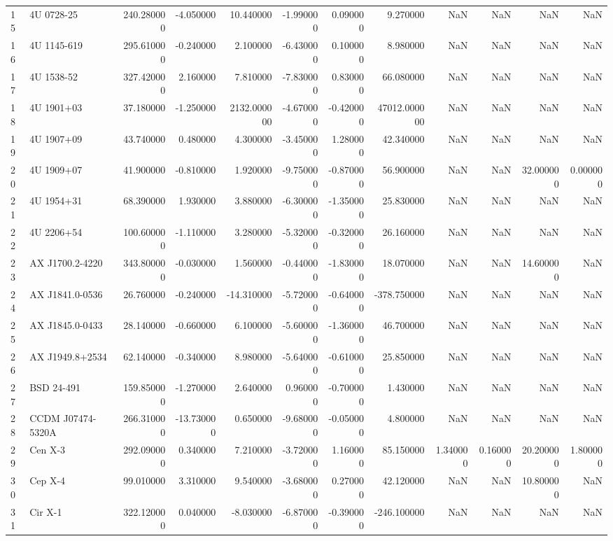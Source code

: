 \begin{tabular}{llrrrrrrrrrr}
15 & 4U 0728-25 & 240.280000 & -4.050000 & 10.440000 & -1.990000 & 0.090000 & 9.270000 & NaN & NaN & NaN & NaN \\
16 & 4U 1145-619 & 295.610000 & -0.240000 & 2.100000 & -6.430000 & 0.100000 & 8.980000 & NaN & NaN & NaN & NaN \\
17 & 4U 1538-52 & 327.420000 & 2.160000 & 7.810000 & -7.830000 & 0.830000 & 66.080000 & NaN & NaN & NaN & NaN \\
18 & 4U 1901+03 & 37.180000 & -1.250000 & 2132.000000 & -4.670000 & -0.420000 & 47012.000000 & NaN & NaN & NaN & NaN \\
19 & 4U 1907+09 & 43.740000 & 0.480000 & 4.300000 & -3.450000 & 1.280000 & 42.340000 & NaN & NaN & NaN & NaN \\
20 & 4U 1909+07 & 41.900000 & -0.810000 & 1.920000 & -9.750000 & -0.870000 & 56.900000 & NaN & NaN & 32.000000 & 0.000000 \\
21 & 4U 1954+31 & 68.390000 & 1.930000 & 3.880000 & -6.300000 & -1.350000 & 25.830000 & NaN & NaN & NaN & NaN \\
22 & 4U 2206+54 & 100.600000 & -1.110000 & 3.280000 & -5.320000 & -0.320000 & 26.160000 & NaN & NaN & NaN & NaN \\
23 & AX J1700.2-4220 & 343.800000 & -0.030000 & 1.560000 & -0.440000 & -1.830000 & 18.070000 & NaN & NaN & 14.600000 & NaN \\
24 & AX J1841.0-0536 & 26.760000 & -0.240000 & -14.310000 & -5.720000 & -0.640000 & -378.750000 & NaN & NaN & NaN & NaN \\
25 & AX J1845.0-0433 & 28.140000 & -0.660000 & 6.100000 & -5.600000 & -1.360000 & 46.700000 & NaN & NaN & NaN & NaN \\
26 & AX J1949.8+2534 & 62.140000 & -0.340000 & 8.980000 & -5.640000 & -0.610000 & 25.850000 & NaN & NaN & NaN & NaN \\
27 & BSD 24-491 & 159.850000 & -1.270000 & 2.640000 & 0.960000 & -0.700000 & 1.430000 & NaN & NaN & NaN & NaN \\
28 & CCDM J07474-5320A & 266.310000 & -13.730000 & 0.650000 & -9.680000 & -0.050000 & 4.800000 & NaN & NaN & NaN & NaN \\
29 & Cen X-3 & 292.090000 & 0.340000 & 7.210000 & -3.720000 & 1.160000 & 85.150000 & 1.340000 & 0.160000 & 20.200000 & 1.800000 \\
30 & Cep X-4 & 99.010000 & 3.310000 & 9.540000 & -3.680000 & 0.270000 & 42.120000 & NaN & NaN & 10.800000 & NaN \\
31 & Cir X-1 & 322.120000 & 0.040000 & -8.030000 & -6.870000 & -0.390000 & -246.100000 & NaN & NaN & NaN & NaN \\

\end{tabular}
